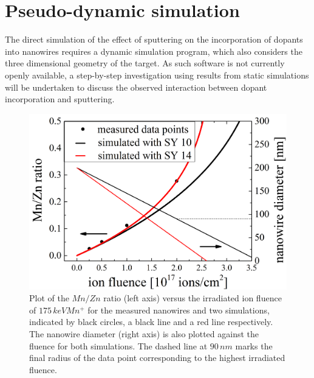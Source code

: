\section{Pseudo-dynamic simulation}

The direct simulation of the effect of sputtering on the incorporation of dopants into nanowires requires a dynamic simulation program, which also considers the three dimensional geometry of the target. As such software is not currently openly available, a step-by-step investigation using results from static simulations will be undertaken to discuss the observed interaction between dopant incorporation and sputtering.

\begin{figure}
	\centering
		\includegraphics[width=.5\textwidth]{images/staticsputteryield.png}
	\caption{Plot of the $Mn/Zn$ ratio (left axis) versus the irradiated ion fluence of $175\,keV Mn^+$ for the measured nanowires and two simulations, indicated by black circles, a black line and a red line respectively. The nanowire diameter (right axis) is also plotted against the fluence for both simulations. The dashed line at $90\,nm$ marks the final radius of the data point corresponding to the highest irradiated fluence.}
	\label{staticsputter}
\end{figure} 

